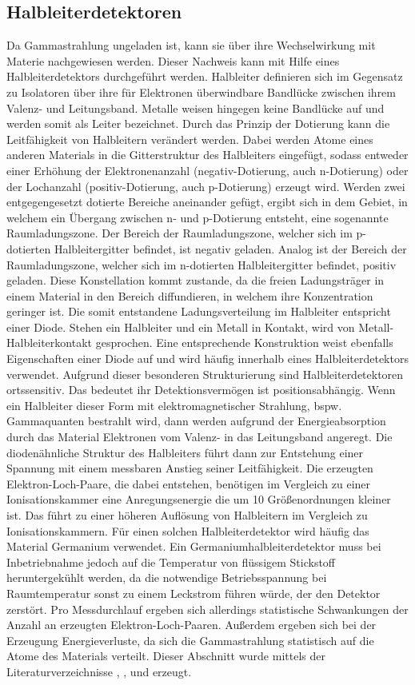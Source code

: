 \subsection{Halbleiterdetektoren}
Da Gammastrahlung ungeladen ist, kann sie über ihre Wechselwirkung mit Materie 
nachgewiesen werden. Dieser Nachweis kann mit Hilfe eines Halbleiterdetektors 
durchgeführt werden. Halbleiter definieren sich im Gegensatz zu Isolatoren über 
ihre für Elektronen überwindbare Bandlücke zwischen ihrem Valenz- und Leitungsband. 
Metalle weisen hingegen keine Bandlücke auf und werden somit als Leiter bezeichnet. 
Durch das Prinzip der Dotierung kann die Leitfähigkeit von Halbleitern verändert werden.
Dabei werden Atome eines anderen Materials in die Gitterstruktur des Halbleiters eingefügt,
sodass entweder einer Erhöhung der Elektronenanzahl (negativ-Dotierung, auch n-Dotierung)
oder der Lochanzahl (positiv-Dotierung, auch p-Dotierung) erzeugt wird. 
Werden zwei entgegengesetzt dotierte Bereiche aneinander gefügt, ergibt sich in dem Gebiet, 
in welchem ein Übergang zwischen n- und p-Dotierung entsteht, eine sogenannte Raumladungszone.
Der Bereich der Raumladungszone, welcher sich im p-dotierten Halbleitergitter befindet, ist 
negativ geladen. Analog ist der Bereich der Raumladungszone, welcher sich im n-dotierten 
Halbleitergitter befindet, positiv geladen. Diese Konstellation kommt zustande, da die freien 
Ladungsträger in einem Material in den Bereich diffundieren, in welchem ihre Konzentration 
geringer ist. Die somit entstandene Ladungsverteilung im Halbleiter entspricht einer Diode.
Stehen ein Halbleiter und ein Metall in Kontakt, wird von Metall-Halbleiterkontakt gesprochen. 
Eine entsprechende Konstruktion weist ebenfalls Eigenschaften einer Diode auf und wird 
häufig innerhalb eines Halbleiterdetektors verwendet.
Aufgrund dieser besonderen Strukturierung sind Halbleiterdetektoren ortssensitiv. Das bedeutet 
ihr Detektionsvermögen ist positionsabhängig. 
Wenn ein Halbleiter dieser Form mit elektromagnetischer Strahlung, bspw. Gammaquanten 
bestrahlt wird, dann werden aufgrund der Energieabsorption durch das Material
Elektronen vom Valenz- in das Leitungsband angeregt. 
Die diodenähnliche Struktur des Halbleiters führt dann zur Entstehung einer
Spannung mit einem messbaren Anstieg seiner Leitfähigkeit.
Die erzeugten Elektron-Loch-Paare, die dabei entstehen, benötigen im Vergleich zu einer 
Ionisationskammer eine Anregungsenergie die um 10 Größenordnungen kleiner ist. 
Das führt zu einer höheren Auflösung von Halbleitern im Vergleich zu Ionisationskammern.
Für einen solchen Halbleiterdetektor wird häufig das Material Germanium verwendet.
Ein Germaniumhalbleiterdetektor muss bei Inbetriebnahme jedoch auf die Temperatur von 
flüssigem Stickstoff heruntergekühlt werden, da die notwendige Betriebsspannung bei 
Raumtemperatur sonst zu einem Leckstrom führen würde, der den Detektor zerstört.
Pro Messdurchlauf ergeben sich allerdings statistische Schwankungen der Anzahl an 
erzeugten Elektron-Loch-Paaren. Außerdem ergeben sich bei der Erzeugung Energieverluste,
da sich die Gammastrahlung statistisch auf die Atome des Materials verteilt.
Dieser Abschnitt wurde mittels der Literaturverzeichnisse \cite{lit1},
\cite{lit2}, \cite{lit3} und \cite{lit4} erzeugt.
